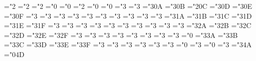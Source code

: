 \ifprod@font
%
\mathchardef\boxdot="2
\mathchardef\boxplus="2
\mathchardef\boxtimes="2
\mathchardef\square="0
\mathchardef\blacksquare="0
\mathchardef\centerdot="2
\mathchardef\lozenge="0
\mathchardef\blacklozenge="0
\mathchardef\circlearrowright="3
\mathchardef\circlearrowleft="3
\mathchardef\rightleftharpoons="3\@xm0A
\mathchardef\leftrightharpoons="3\@xm0B
\mathchardef\boxminus="2\@xm0C
\mathchardef\Vdash="3\@xm0D
\mathchardef\Vvdash="3\@xm0E
\mathchardef\vDash="3\@xm0F
\mathchardef\twoheadrightarrow="3
\mathchardef\twoheadleftarrow="3
\mathchardef\leftleftarrows="3
\mathchardef\rightrightarrows="3
\mathchardef\upuparrows="3
\mathchardef\downdownarrows="3
\mathchardef\upharpoonright="3
\let\restriction=\upharpoonright
\mathchardef\downharpoonright="3
\mathchardef\upharpoonleft="3
\mathchardef\downharpoonleft="3
\mathchardef\rightarrowtail="3\@xm1A
\mathchardef\leftarrowtail="3\@xm1B
\mathchardef\leftrightarrows="3\@xm1C
\mathchardef\rightleftarrows="3\@xm1D
\mathchardef\Lsh="3\@xm1E
\mathchardef\Rsh="3\@xm1F
\mathchardef\rightsquigarrow="3
\mathchardef\leftrightsquigarrow="3
\mathchardef\looparrowleft="3
\mathchardef\looparrowright="3
\mathchardef\circeq="3
\mathchardef\succsim="3
\mathchardef\gtrsim="3
\mathchardef\gtrapprox="3
\mathchardef\multimap="3
\mathchardef\therefore="3
\mathchardef\because="3\@xm2A
\mathchardef\doteqdot="3\@xm2B
\let\Doteq=\doteqdot
\mathchardef\triangleq="3\@xm2C
\mathchardef\precsim="3\@xm2D
\mathchardef\lesssim="3\@xm2E
\mathchardef\lessapprox="3\@xm2F
\mathchardef\eqslantless="3
\mathchardef\eqslantgtr="3
\mathchardef\curlyeqprec="3
\mathchardef\curlyeqsucc="3
\mathchardef\preccurlyeq="3
\mathchardef\leqq="3
\mathchardef\leqslant="3
\mathchardef\lessgtr="3
\mathchardef\backprime="0
\mathchardef\risingdotseq="3\@xm3A
\mathchardef\fallingdotseq="3\@xm3B
\mathchardef\succcurlyeq="3\@xm3C
\mathchardef\geqq="3\@xm3D
\mathchardef\geqslant="3\@xm3E
\mathchardef\gtrless="3\@xm3F
\mathchardef\sqsubset="3
\mathchardef\sqsupset="3
\mathchardef\vartriangleright="3
\mathchardef\vartriangleleft="3
\mathchardef\trianglerighteq="3
\mathchardef\trianglelefteq="3
\mathchardef\bigstar="0
\mathchardef\between="3
\mathchardef\blacktriangledown="0
\mathchardef\blacktriangleright="3
\mathchardef\blacktriangleleft="3\@xm4A
\mathchardef\vartriangle="0\@xm4D
